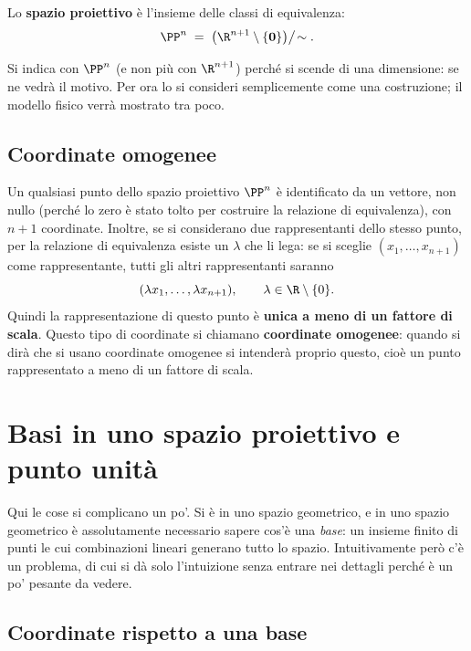 \begin{definizione}
Lo \textbf{spazio proiettivo} è l'insieme delle classi di equivalenza:
\[
  \PP^{n} \;=\; \bigl(\R^{n+1}\setminus\{\mathbf{0}\}\bigr)\big/\!\sim .
\]
\end{definizione}

Si indica con $\PP^n$ (e non più con $\R^{n+1}$) perché si scende di una dimensione: se ne vedrà il motivo. Per ora lo si consideri semplicemente come una costruzione; il modello fisico verrà mostrato tra poco.

\subsection{Coordinate omogenee}

Un qualsiasi punto dello spazio proiettivo $\PP^n$ è identificato da un vettore, non nullo (perché lo zero è stato tolto per costruire la relazione di equivalenza), con $n+1$ coordinate. Inoltre, se si considerano due rappresentanti dello stesso punto, per la relazione di equivalenza esiste un $\lambda$ che li lega: se si sceglie $(x_1,\dots,x_{n+1})$ come rappresentante, tutti gli altri rappresentanti saranno
\[
  (\lambda x_1,\dots,\lambda x_{n+1}),\qquad \lambda\in\R\setminus\{0\}.
\]
Quindi la rappresentazione di questo punto è \textbf{unica a meno di un fattore di scala}. Questo tipo di coordinate si chiamano \textbf{coordinate omogenee}: quando si dirà che si usano coordinate omogenee si intenderà proprio questo, cioè un punto rappresentato a meno di un fattore di scala.

\section{Basi in uno spazio proiettivo e punto unità}

Qui le cose si complicano un po'. Si è in uno spazio geometrico, e in uno spazio geometrico è assolutamente necessario sapere cos'è una \emph{base}: un insieme finito di punti le cui combinazioni lineari generano tutto lo spazio. Intuitivamente però c'è un problema, di cui si dà solo l'intuizione senza entrare nei dettagli perché è un po' pesante da vedere.

\subsection{Coordinate rispetto a una base}

